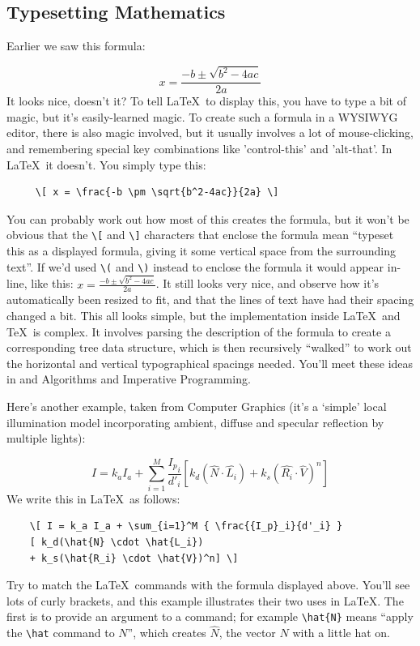 \begin{refsection}
\subsection{Typesetting Mathematics}
\label{mathssection}

Earlier we saw this formula:

\[ x = \frac{-b \pm \sqrt{b^2-4ac}}{2a} \]
It looks nice, doesn't it? To tell \LaTeX\ to display this, you have to type a bit of magic, but it's easily-learned magic. To create such a formula in a WYSIWYG editor, there is also magic involved, but it usually involves a lot of mouse-clicking, and remembering special key combinations like 'control-this' and 'alt-that'. In \LaTeX\ it doesn't. You simply type this:
\begin{verbatim}
     \[ x = \frac{-b \pm \sqrt{b^2-4ac}}{2a} \]
\end{verbatim}
You can probably work out how most of this creates the formula, but it won't be obvious that the \verb|\[| and  \verb|\]| characters that enclose the formula mean ``typeset this as a displayed formula, giving it some vertical space from the surrounding text''. If we'd used \verb|\(| and \verb|\)| instead to enclose the formula it would appear in-line, like this: \(  x = \frac{-b \pm \sqrt{b^2-4ac}}{2a} \). It still looks very nice, and observe how it's automatically been resized to fit, and that the lines of text have had their spacing changed a bit. This all looks simple, but the implementation inside \LaTeX\ and \TeX\ is complex. It involves parsing the description of the formula to create a corresponding tree data structure, which is then recursively ``walked'' to work out the horizontal and vertical typographical spacings needed. You'll meet these ideas in  and  Algorithms and Imperative Programming.

Here's another example, taken from  Computer Graphics (it's a `simple' local illumination model incorporating ambient, diffuse and specular reflection by multiple lights):

\[ I = k_a I_a + \sum_{i=1}^M {\frac{{I_p}_i}{d'_i}} [ k_d(\hat{N}\cdot\hat{L_i}) + k_s(\hat{R_i}\cdot\hat{V})^n] \]
%
We write this in \LaTeX\ as follows:

\begin{verbatim}
    \[ I = k_a I_a + \sum_{i=1}^M { \frac{{I_p}_i}{d'_i} }
    [ k_d(\hat{N} \cdot \hat{L_i}) 
    + k_s(\hat{R_i} \cdot \hat{V})^n] \]
\end{verbatim}
%
Try to match the \LaTeX\ commands with the formula displayed above. You'll see lots of curly brackets, and this example illustrates their two uses in \LaTeX. The first is to provide an argument to a command; for example \verb|\hat{N}| means ``apply the \verb|\hat| command to $N$'', which creates \(\hat{N}\), the vector \( N \) with a little hat  on.  


\end{refsection}
